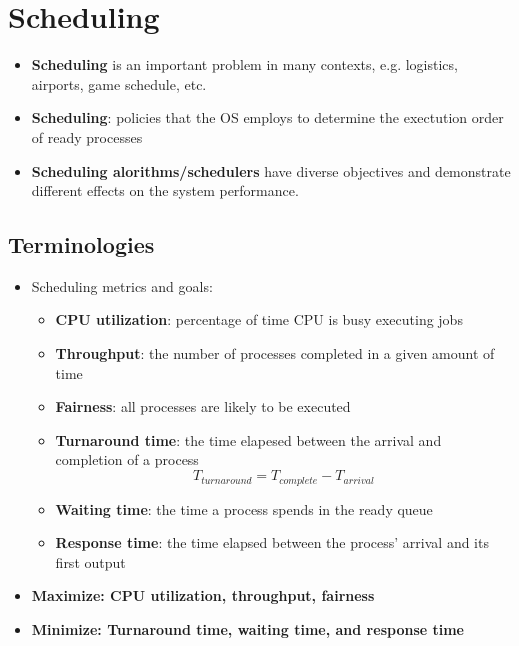 \documentclass[a4paper,11pt,english]{article}
\begin{document}


\section*{Scheduling}
\begin{itemize}
    \item \textbf{\color{blue} Scheduling} is an important problem in many contexts, e.g. logistics, airports, game schedule, etc.
    \item \textbf{\color{blue} Scheduling}: policies that the OS employs to determine the exectution order of ready processes
    \item \textbf{\color{blue} Scheduling alorithms/schedulers} have diverse objectives and demonstrate different effects on the system performance.
\end{itemize}

\subsection*{Terminologies}
\begin{itemize}
    \item Scheduling metrics and goals:
        \begin{itemize}
            \item \textbf{\color{blue} CPU utilization}: percentage of time CPU is busy executing jobs
            \item \textbf{\color{blue} Throughput}: the number of processes completed in a given amount of time
            \item \textbf{\color{blue} Fairness}: all processes are likely to be executed
            \item \textbf{\color{red} Turnaround time}: the time elapesed between the arrival and completion of a process
                \[
                    T_{turnaround} = T_{complete} - T_{arrival}
                \]
            \item \textbf{\color{red} Waiting time}: the time a process spends in the ready queue
            \item \textbf{\color{red} Response time}: the time elapsed between the process' arrival and its first output
        \end{itemize}
    \item \textbf{\color{blue} Maximize: CPU utilization, throughput, fairness}
    \item \textbf{\color{red} Minimize: Turnaround time, waiting time, and response time}
\end{itemize}
\end{document}
